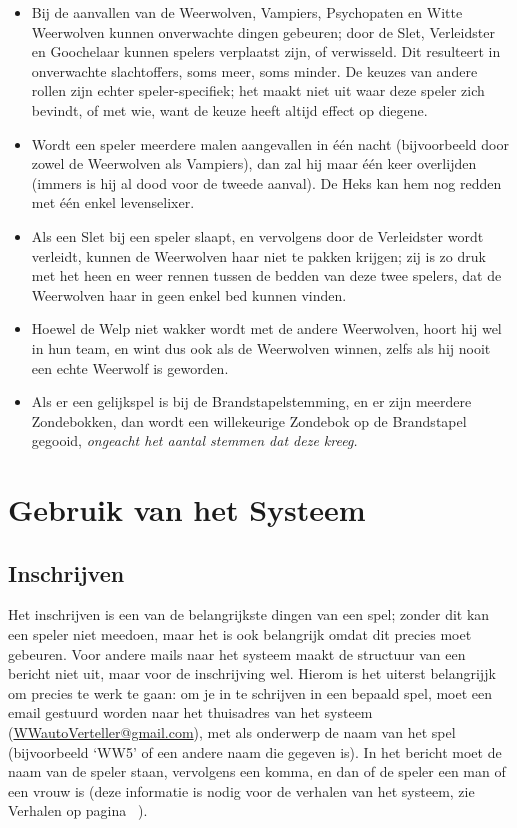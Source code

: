 \documentclass[12pt]{article}
\begin{document}
\begin{itemize}
  	\item Bij de aanvallen van de Weerwolven, Vampiers, Psychopaten en Witte Weerwolven kunnen onverwachte dingen gebeuren; door de Slet, Verleidster en Goochelaar kunnen spelers verplaatst zijn, of verwisseld. Dit resulteert in onverwachte slachtoffers, soms meer, soms minder. De keuzes van andere rollen zijn echter speler-specifiek; het maakt niet uit waar deze speler zich bevindt, of met wie, want de keuze heeft altijd effect op diegene.
  	\item Wordt een speler meerdere malen aangevallen in \'e\'en nacht (bijvoorbeeld door zowel de Weerwolven als Vampiers), dan zal hij maar \'e\'en keer overlijden (immers is hij al dood voor de tweede aanval). De Heks kan hem nog redden met \'e\'en enkel levenselixer.
  	\item Als een Slet bij een speler slaapt, en vervolgens door de Verleidster wordt verleidt, kunnen de Weerwolven haar niet te pakken krijgen; zij is zo druk met het heen en weer rennen tussen de bedden van deze twee spelers, dat de Weerwolven haar in geen enkel bed kunnen vinden.
  	\item Hoewel de Welp niet wakker wordt met de andere Weerwolven, hoort hij wel in hun team, en wint dus ook als de Weerwolven winnen, zelfs als hij nooit een echte Weerwolf is geworden.
  	\item Als er een gelijkspel is bij de Brandstapelstemming, en er zijn meerdere Zondebokken, dan wordt een willekeurige Zondebok op de Brandstapel gegooid, \emph{ongeacht het aantal stemmen dat deze kreeg.}
    \end{itemize}

\section{Gebruik van het Systeem}

  \subsection{Inschrijven}
  
    Het inschrijven is een van de belangrijkste dingen van een spel; zonder dit kan een speler niet meedoen, maar het is ook belangrijk omdat dit precies moet gebeuren. Voor andere mails naar het systeem maakt de structuur van een bericht niet uit, maar voor de inschrijving wel. Hierom is het uiterst belangrijjk om precies te werk te gaan: om je in te schrijven in een bepaald spel, moet een email gestuurd worden naar het thuisadres van het systeem (\href{mailto:<WWautoVerteller@gmail.com>}{WWautoVerteller@gmail.com}), met als onderwerp de naam van het spel (bijvoorbeeld `WW5' of een andere naam die gegeven is). In het bericht moet de naam van de speler staan, vervolgens een komma, en dan of de speler een man of een vrouw is (deze informatie is nodig voor de verhalen van het systeem, zie Verhalen op pagina~\pageref{subsec:verhalen} ).
    
\end{document}
